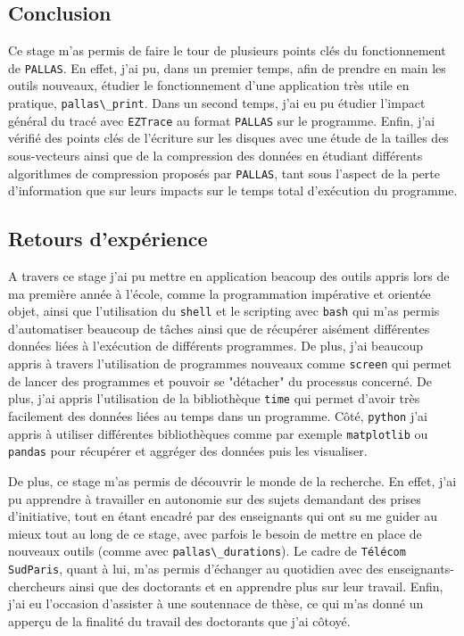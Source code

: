 
\subsection{Conclusion}\label{ssec:conclusion_conclusion}

Ce stage m'as permis de faire le tour de plusieurs points clés du fonctionnement de \verb!PALLAS!.
En effet, j'ai pu, dans un premier temps, afin de prendre en main les outils nouveaux, étudier le fonctionnement d'une application très utile en pratique, \verb!pallas\_print!.
Dans un second temps, j'ai eu pu étudier l'impact général du tracé avec \verb!EZTrace! au format \verb!PALLAS! sur le programme.
Enfin, j'ai vérifié des points clés de l'écriture sur les disques avec une étude de la tailles des sous-vecteurs ainsi que de la compression des données en étudiant différents algorithmes 
de compression proposés par \verb!PALLAS!, tant sous l'aspect de la perte d'information que sur leurs impacts sur le temps total d'exécution du programme.


\subsection{Retours d'expérience}\label{ssec:conclusion_retours}


A travers ce stage j'ai pu mettre en application beacoup des outils appris lors de ma première année à l'école, comme la programmation impérative et orientée objet, ainsi que 
l'utilisation du \verb!shell! et le scripting avec \verb!bash! qui m'as permis d'automatiser beaucoup de tâches ainsi que de récupérer aisément différentes données liées 
à l'exécution de différents programmes.
De plus, j'ai beaucoup appris à travers l'utilisation de programmes nouveaux comme \verb!screen! qui permet de lancer des programmes et pouvoir se "détacher"
du processus concerné. De plus, j'ai appris l'utilisation de la bibliothèque \verb!time! qui permet d'avoir très facilement des données liées au temps dans un programme. Côté, \verb!python!
j'ai appris à utiliser différentes bibliothèques comme par exemple \verb!matplotlib! ou \verb!pandas! pour récupérer et aggréger des données puis les visualiser.

De plus, ce stage m'as permis de découvrir le monde de la recherche. En effet, j'ai pu apprendre à travailler en autonomie sur des sujets demandant des prises d'initiative, tout en étant 
encadré par des enseignants qui ont su me guider au mieux tout au long de ce stage, avec 
parfois le besoin de mettre en place de nouveaux outils (comme avec \verb!pallas\_durations!). Le cadre de \verb!Télécom SudParis!, quant à lui, m'as permis d'échanger au quotidien 
avec des enseignants-chercheurs ainsi que des doctorants et en apprendre plus sur leur travail. Enfin, j'ai eu l'occasion d'assister à une soutennace de thèse, ce qui m'as 
donné un apperçu de la finalité du travail des doctorants que j'ai côtoyé.

